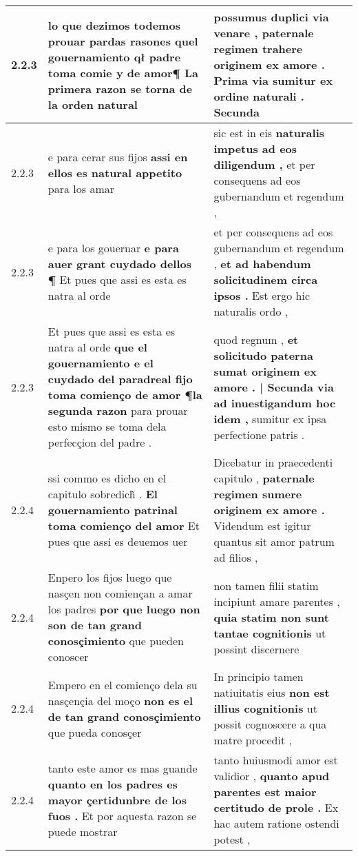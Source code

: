 \begin{tabular}{|p{1cm}|p{6.5cm}|p{6.5cm}|}
2.2.3 & lo que dezimos todemos prouar pardas rasones \textbf{ quel gouernamiento qł padre toma comie y de amor¶ } La primera razon se torna de la orden natural & possumus duplici via venare , \textbf{ paternale regimen trahere originem ex amore . Prima via sumitur ex ordine naturali . } Secunda \\\hline
2.2.3 & e para cerar sus fijos \textbf{ assi en ellos es natural appetito } para los amar & sic est in eis \textbf{ naturalis impetus ad eos diligendum , } et per consequens ad eos gubernandum et regendum , \\\hline
2.2.3 & e para los gouernar \textbf{ e para auer grant cuydado dellos ¶ } Et pues que assi es esta es natra al orde & et per consequens ad eos gubernandum et regendum , \textbf{ et ad habendum solicitudinem circa ipsos . } Est ergo hic naturalis ordo , \\\hline
2.2.3 & Et pues que assi es esta es natra al orde \textbf{ que el gouernamiento e el cuydado del paradreal fijo toma comienço de amor ¶la segunda razon } para prouar esto mismo se toma dela perfecçion del padre . & quod regnum , \textbf{ et solicitudo paterna sumat originem ex amore . | Secunda via ad inuestigandum hoc idem , } sumitur ex ipsa perfectione patris . \\\hline
2.2.4 & ssi commo es dicho en el capitulo sobredich̃ . \textbf{ El gouernamiento patrinal toma comienço del amor } Et pues que assi es deuemos uer & Dicebatur in praecedenti capitulo , \textbf{ paternale regimen sumere originem ex amore . } Videndum est igitur quantus sit amor patrum ad filios , \\\hline
2.2.4 & Enpero los fijos luego que nasçen non comiençan a amar los padres \textbf{ por que luego non son de tan grand conosçimiento } que pueden conoscer & non tamen filii statim incipiunt amare parentes , \textbf{ quia statim non sunt tantae cognitionis } ut possint discernere \\\hline
2.2.4 & Empero en el comienço dela su nasçençia del moço \textbf{ non es el de tan grand conosçimiento } que pueda conosçer & In principio tamen natiuitatis eius \textbf{ non est illius cognitionis } ut possit cognoscere a qua matre procedit , \\\hline
2.2.4 & tanto este amor es mas guande \textbf{ quanto en los padres es mayor çertidunbre de los fuos . } Et por aquesta razon se puede mostrar & tanto huiusmodi amor est validior , \textbf{ quanto apud parentes est maior certitudo de prole . } Ex hac autem ratione ostendi potest , \\\hline

\end{tabular}
